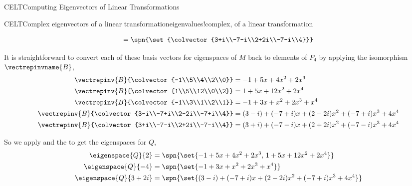 \begin{subsect}{CELT}{Computing Eigenvectors of Linear Transformations}
\begin{example}{CELT}{Complex eigenvectors of a linear transformation}{eigenvalues!complex, of a linear transformation}
\begin{para}
\begin{align*}
=\spn{\set{\colvector{3+i\\-7-i\\2+2i\\-7-i\\4}}}
\end{align*}
\end{para}
%
\begin{para}It is straightforward to convert each of these basis vectors for eigenspaces of $M$ back to elements of $P_4$ by applying the isomorphism $\vectrepinvname{B}$,
%
\begin{align*}
\vectrepinv{B}{\colvector{-1\\5\\4\\2\\0}}&=-1+5x+4x^2+2x^3\\
%
\vectrepinv{B}{\colvector{1\\5\\12\\0\\2}}&=1+5x+12x^2+2x^4\\
%
\vectrepinv{B}{\colvector{-1\\3\\1\\2\\1}}&=-1+3x+x^2+2x^3+x^4\\
%
\vectrepinv{B}{\colvector{3-i\\-7+i\\2-2i\\-7+i\\4}}&=(3-i)+(-7+i)x+(2-2i)x^2+(-7+i)x^3+4x^4\\
%
\vectrepinv{B}{\colvector{3+i\\-7-i\\2+2i\\-7-i\\4}}&=(3+i)+(-7-i)x+(2+2i)x^2+(-7-i)x^3+4x^4\\
%
\end{align*}
\end{para}
%
\begin{para}So we apply  and the  to get the eigenspaces for $Q$,
%
\begin{align*}
%
\eigenspace{Q}{2}&=\spn{\set{-1+5x+4x^2+2x^3,\,1+5x+12x^2+2x^4}}\\
%
\eigenspace{Q}{-4}&=\spn{\set{-1+3x+x^2+2x^3+x^4}}\\
%
\eigenspace{Q}{3+2i}&=\spn{\set{(3-i)+(-7+i)x+(2-2i)x^2+(-7+i)x^3+4x^4}}\\

\end{align*}
\end{para}
\end{example}
\end{subsect}

